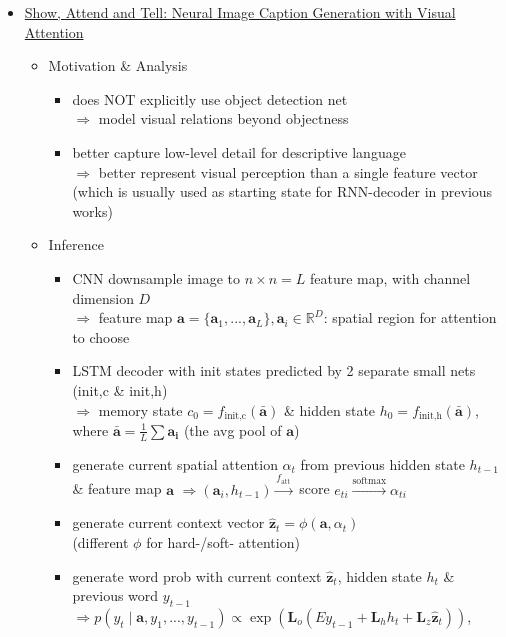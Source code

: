 \begin{itemize}
\item \underline{Show, Attend and Tell: Neural Image Caption Generation with Visual Attention} \label{DL_CVNLP_Imgcap_show_attend_tell}
	\begin{itemize}
	\item Motivation \& Analysis
		\begin{itemize}
		\item does NOT explicitly use object detection net \\ 
		$\Rightarrow$ model visual relations beyond objectness
		\item better capture low-level detail for descriptive language \\
		$\Rightarrow$ better represent visual perception than a single feature vector \\
		(which is usually used as starting state for RNN-decoder in previous works)
		\end{itemize}
	\item Inference
		\begin{itemize}
		\item CNN downsample image to $n\times n=L$ feature map, with channel dimension $D$ \\
		$\Rightarrow$ feature map $\mathbf a = \{\mathbf a_1, ..., \mathbf a_L \}, \mathbf a_i\in\mathbb R^D$: spatial region for attention to choose
		\item LSTM decoder with init states predicted by 2 separate small nets (\small{init,c \& init,h}) \\
		$\Rightarrow$ memory state $c_0 = f_\text{init,c}(\bar {\mathbf a})$ \& hidden state $h_0 = f_\text{init,h}(\bar {\mathbf a})$, \\
		where $\bar {\mathbf a}=\frac 1 L \sum \mathbf{a_i}$ (the avg pool of $\mathbf a$)
		\item generate current spatial attention $\alpha_t$ from previous hidden state $h_{t-1}$ \& feature map $\mathbf a$
		$\Rightarrow (\mathbf a_i, h_{t-1}) \xrightarrow{f_\text{att}}$ score $e_{ti} \xrightarrow{\text{softmax}} \alpha_{ti}$
		\item generate current context vector $\hat{\mathbf z}_t =\phi(\mathbf a, \alpha_t)$ \\
		(different $\phi$ for hard-/soft- attention)
		\item generate word prob with current context $\hat{\mathbf z}_t$, hidden state $h_t$ \& previous word $y_{t-1}$ \\
		$\Rightarrow p(y_t \mid \mathbf a, y_1,...,y_{t-1}) \propto \exp(\mathbf L_o\left( E y_{t-1} + \mathbf L_h h_t + \mathbf L_z \hat {\mathbf z}_t \right) )$, \\

\end{itemize}
\end{itemize}
\end{itemize}
